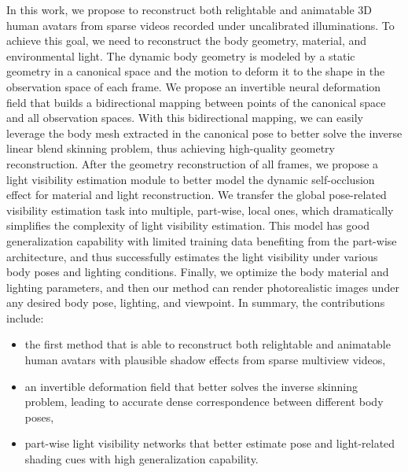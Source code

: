 In this work, we propose to reconstruct both relightable and animatable 3D human avatars from sparse videos recorded under uncalibrated illuminations. 
To achieve this goal, we need to reconstruct the body geometry, material, and environmental light.
The dynamic body geometry is modeled by a static geometry in a canonical space and the motion to deform it to the shape in the observation space of each frame.
We propose an invertible neural deformation field that builds a bidirectional mapping between points of the canonical space and all observation spaces. 
With this bidirectional mapping, we can easily leverage the body mesh extracted in the canonical pose to better solve the inverse linear blend skinning problem, thus achieving high-quality geometry reconstruction.
After the geometry reconstruction of all frames, we propose a light visibility estimation module to better model the dynamic self-occlusion effect for material and light reconstruction.
We transfer the global pose-related visibility estimation task into multiple, part-wise, local ones, which dramatically simplifies the complexity of light visibility estimation.
This model has good generalization capability with limited training data benefiting from the part-wise architecture, and thus successfully estimates the light visibility under various body poses and lighting conditions.
Finally, we optimize the body material and lighting parameters, and then our method can render photorealistic images under any desired body pose, lighting, and viewpoint.
In summary, the contributions include:
\begin{itemize}
    \item 
    the first method that is able to reconstruct both relightable and animatable human avatars with plausible shadow effects from sparse multiview videos,
    \item 
    an invertible deformation field that better solves the inverse skinning problem, leading to accurate dense correspondence between different body poses,
    \item 
    part-wise light visibility networks that better estimate pose and light-related shading cues with high generalization capability.
\end{itemize}
